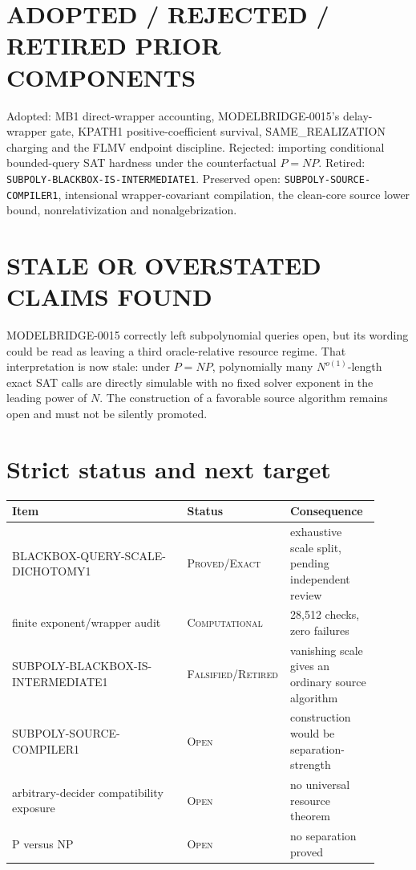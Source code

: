 \documentclass[11pt]{article}
\newcommand{\status}[1]{\textsc{#1}}
\begin{document}
\section{ADOPTED / REJECTED / RETIRED PRIOR COMPONENTS}

Adopted: MB1 direct-wrapper accounting, MODELBRIDGE-0015's delay-wrapper
gate, KPATH1 positive-coefficient survival, SAME\_REALIZATION charging and
the FLMV endpoint discipline.  Rejected: importing conditional bounded-query
SAT hardness under the counterfactual $P=NP$.  Retired:
\texttt{SUBPOLY-BLACKBOX-IS-INTERMEDIATE1}.  Preserved open:
\texttt{SUBPOLY-SOURCE-COMPILER1}, intensional wrapper-covariant compilation,
the clean-core source lower bound, nonrelativization and nonalgebrization.

\section{STALE OR OVERSTATED CLAIMS FOUND}

MODELBRIDGE-0015 correctly left subpolynomial queries open, but its wording
could be read as leaving a third oracle-relative resource regime.  That
interpretation is now stale: under $P=NP$, polynomially many
$N^{o(1)}$-length exact SAT calls are directly simulable with no fixed solver
exponent in the leading power of $N$.  The construction of a favorable
source algorithm remains open and must not be silently promoted.

\section*{Strict status and next target}

\begin{center}
\begin{tabular}{@{}p{0.47\linewidth}p{0.20\linewidth}p{0.24\linewidth}@{}}
\toprule
Item & Status & Consequence\\ \midrule
BLACKBOX-QUERY-SCALE-DICHOTOMY1 & \status{Proved/Exact} & exhaustive scale split, pending independent review\\
finite exponent/wrapper audit & \status{Computational} & 28,512 checks, zero failures\\
SUBPOLY-BLACKBOX-IS-INTERMEDIATE1 & \status{Falsified/Retired} & vanishing scale gives an ordinary source algorithm\\
SUBPOLY-SOURCE-COMPILER1 & \status{Open} & construction would be separation-strength\\
arbitrary-decider compatibility exposure & \status{Open} & no universal resource theorem\\
P versus NP & \status{Open} & no separation proved\\
\bottomrule
\end{tabular}
\end{center}
\end{document}
